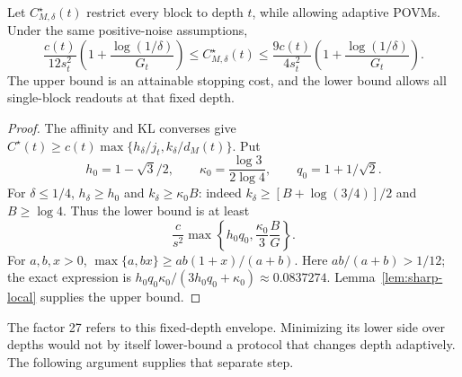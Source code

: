 \begin{theorem}
\label{thm:fixed-depth-sharp}
Let $C_{M,\delta}^\star(t)$ restrict every block to depth $t$, while
allowing adaptive POVMs. Under the same positive-noise assumptions,
\begin{equation}\label{eq:fixed-depth-sharp}
 \frac{c(t)}{12s_t^2}\left(1+\frac{\log(1/\delta)}{G_t}\right)
 \leq C_{M,\delta}^\star(t)
 \leq\frac{9c(t)}{4s_t^2}
             \left(1+\frac{\log(1/\delta)}{G_t}\right).
\end{equation}
The upper bound is an attainable stopping cost, and the lower bound
allows all single-block readouts at that fixed depth.
\end{theorem}
\begin{proof}
The affinity and KL converses give
$C^\star(t)\geq c(t)\max\{h_\delta/j_t,k_\delta/d_M(t)\}$.
Put
\[
 h_0=1-\sqrt3/2,\qquad
 \kappa_0=\frac{\log3}{2\log4},\qquad q_0=1+1/\sqrt2.
\]
For $\delta\leq1/4$, $h_\delta\geq h_0$ and
$k_\delta\geq\kappa_0B$: indeed
$k_\delta\geq[B+\log(3/4)]/2$ and $B\geq\log4$.
Thus the lower bound is at least
\[
 \frac c{s^2}\max\left\{h_0q_0,\frac{\kappa_0}{3}\frac B G\right\}.
\]
For $a,b,x>0$, $\max\{a,bx\}\geq ab(1+x)/(a+b)$.
Here $ab/(a+b)>1/12$; the exact expression is
$h_0q_0\kappa_0/(3h_0q_0+\kappa_0)\approx0.0837274$.
Lemma~\ref{lem:sharp-local} supplies the upper bound.
\end{proof}

The factor 27 refers to this fixed-depth envelope. Minimizing its lower
side over depths would not by itself lower-bound a protocol that changes
depth adaptively. The following argument supplies that separate step.

